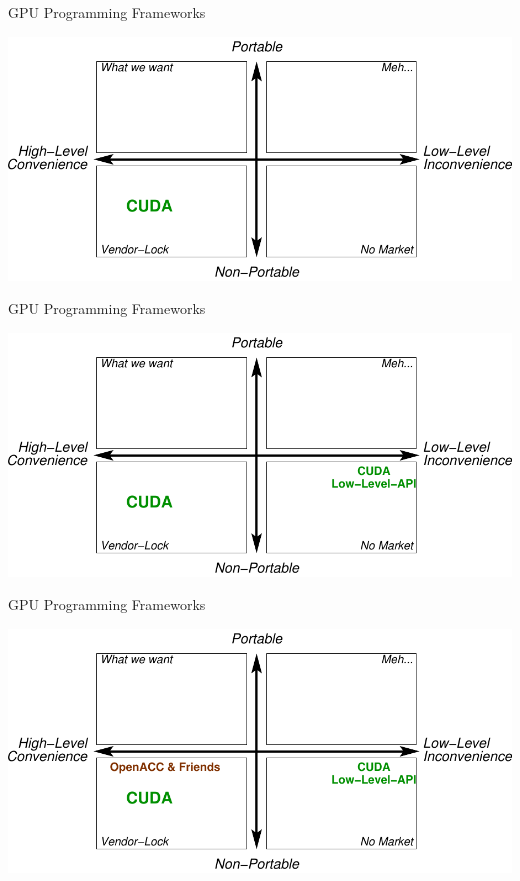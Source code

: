 \begin{frame}[fragile]{GPU Programming Frameworks}
 \begin{center}
  \includegraphics[width=\textwidth]{figures/gpu-programming-comparison-3}
 \end{center}
\end{frame}


\begin{frame}[fragile]{GPU Programming Frameworks}
 \begin{center}
  \includegraphics[width=\textwidth]{figures/gpu-programming-comparison-4}
 \end{center}
\end{frame}

\begin{frame}[fragile]{GPU Programming Frameworks}
 \begin{center}
  \includegraphics[width=\textwidth]{figures/gpu-programming-comparison-5}
 \end{center}
\end{frame}

